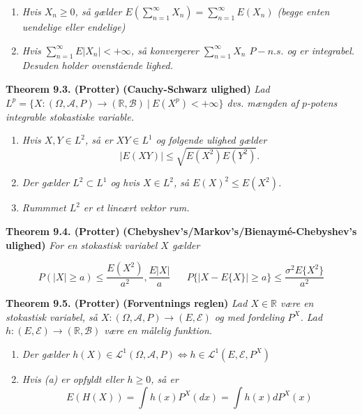 \documentclass[a4paper,10pt,openany]{book}
\providecommand{\tightlist}{%
 \setlength{\itemsep}{0pt}\setlength{\parskip}{0pt}}
\begin{document}
\begin{enumerate}
\def\labelenumi{\alph{enumi}.}
\tightlist
\item
  \emph{Hvis \(X_n\ge0\), så gælder \(E\left(\sum_{n=1}^\infty X_n\right)=\sum_{n=1}^\infty E(X_n)\) (begge enten uendelige eller endelige)}
\item
  \emph{Hvis \(\sum_{n=1}^\infty E\vert X_n\vert <+\infty\), så konvergerer \(\sum_{n=1}^\infty X_n\) \(P-n.s.\) og er integrabel. Desuden holder ovenstående lighed.}
\end{enumerate}

\textbf{Theorem 9.3. (Protter)} \textbf{(Cauchy-Schwarz ulighed)} \emph{Lad \(L^p=\{X : (\Omega,\mathcal{A},P)\to(\mathbb{R},\mathcal{B})\ \vert\ E(X^p)< +\infty\}\) dvs. mængden af \(p\)-potens integrable stokastiske variable.}

\begin{enumerate}
\def\labelenumi{\alph{enumi}.}
\tightlist
\item
  \emph{Hvis \(X,Y\in L^2\), så er \(XY\in L^1\) og følgende ulighed gælder}
  \[
    \vert E(XY)\vert \le \sqrt{E(X^2)E(Y^2)}.
    \]
\item
  \emph{Der gælder \(L^2\subset L^1\) og hvis \(X\in L^2\), så \(E(X)^2\le E(X^2)\).}
\item
  \emph{Rummmet \(L^2\) er et lineært vektor rum.}
\end{enumerate}

\textbf{Theorem 9.4. (Protter)} \textbf{(Chebyshev's/Markov's/Bienaymé-Chebyshev's ulighed)} \emph{For en stokastisk variabel \(X\) gælder}

\[
P(\vert X\vert \ge a)\le \frac{E(X^2)}{a^2},\frac{E\vert X\vert}{a} \hspace{20pt} P\{\vert X-E\{X\}\vert\ge a\}\le \frac{\sigma^2 E\{X^2\}}{a^2}
\]

\textbf{Theorem 9.5. (Protter)} \textbf{(Forventnings reglen)} \emph{Lad \(X\in \mathbb{R}\) være en stokastisk variabel, så \(X : (\Omega, \mathcal{A}, P)\to (E,\mathcal{E})\) og med fordeling \(P^X\). Lad \(h : (E,\mathcal{E})\to(\mathbb{R},\mathcal{B})\) være en målelig funktion.}

\begin{enumerate}
\def\labelenumi{\alph{enumi}.}
\tightlist
\item
  \emph{Der gælder \(h(X)\in\mathcal{L}^1(\Omega, \mathcal{A}, P)\iff h\in\mathcal{L}^1(E, \mathcal{E}, P^X)\)}
\item
  \emph{Hvis (a) er opfyldt eller \(h\ge 0\), så er}
  \[
    E(H(X))=\int h(x)P^X(dx)=\int h(x)dP^X(x)
    \]
\end{enumerate}
\end{document}
